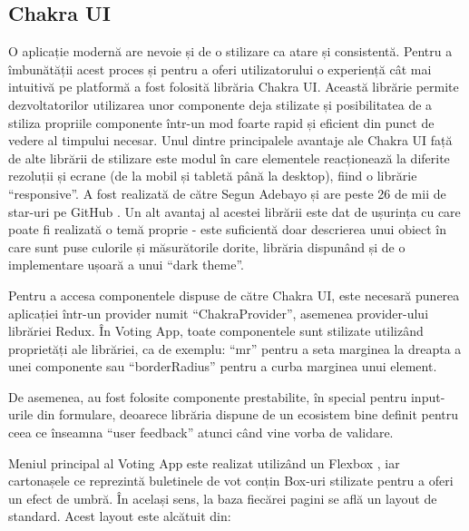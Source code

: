 \subsection{Chakra UI}

O aplicație modernă are nevoie și de o stilizare ca atare și consistentă. Pentru a îmbunătății acest proces și pentru a oferi utilizatorului o experiență cât mai intuitivă pe platformă a fost folosită librăria Chakra UI. Această librărie permite dezvoltatorilor utilizarea unor componente deja stilizate și posibilitatea de a stiliza propriile componente într-un mod foarte rapid și eficient din punct de vedere al timpului necesar. Unul dintre principalele avantaje ale Chakra UI față de alte librării de stilizare este modul în care elementele reacționează la diferite rezoluții și ecrane (de la mobil și tabletă până la desktop), fiind o librărie \enquote{responsive}. A fost realizată de către Segun Adebayo și are peste 26 de mii de star-uri pe GitHub \cite{chakra_github}. Un alt avantaj al acestei librării este dat de ușurința cu care poate fi realizată o temă proprie - este suficientă doar descrierea unui obiect în care sunt puse culorile și măsurătorile dorite, librăria dispunând și de o implementare ușoară a unui \enquote{dark theme}.

Pentru a accesa componentele dispuse de către Chakra UI, este necesară punerea aplicației într-un provider numit \enquote{ChakraProvider}, asemenea provider-ului librăriei Redux. În Voting App, toate componentele sunt stilizate utilizând proprietăți ale librăriei, ca de exemplu: \enquote{mr} pentru a seta marginea la dreapta a unei componente sau \enquote{borderRadius} pentru a curba marginea unui element.

De asemenea, au fost folosite componente prestabilite, în special pentru input-urile din formulare, deoarece librăria dispune de un ecosistem bine definit pentru ceea ce înseamna \enquote{user feedback} atunci când vine vorba de validare.

Meniul principal al Voting App este realizat utilizând un Flexbox \cite{flexbox}, iar cartonașele ce reprezintă buletinele de vot conțin Box-uri stilizate pentru a oferi un efect de umbră. În același sens, la baza fiecărei pagini se află un layout de standard. Acest layout este alcătuit din:

